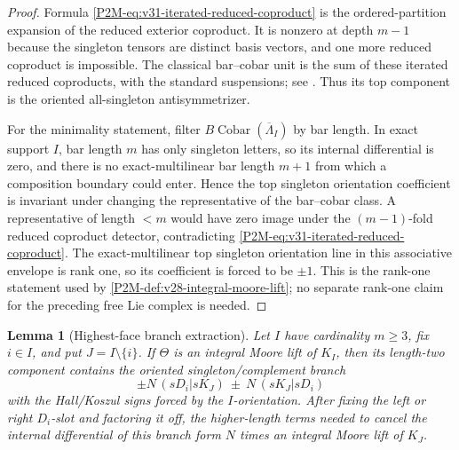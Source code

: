 \documentclass[11pt]{article}
\newtheorem{lemma}[theorem]{Lemma}
\theoremstyle{remark}
\newcommand{\Cobar}{\operatorname{Cobar}}
\begin{document}
\begin{proof}
Formula \eqref{P2M-eq:v31-iterated-reduced-coproduct} is the ordered-partition
expansion of the reduced exterior coproduct.  It is nonzero at depth
\(m-1\) because the singleton tensors are distinct basis vectors, and one
more reduced coproduct is impossible.  The classical bar--cobar unit is the
sum of these iterated reduced coproducts, with the standard suspensions; see
\cite{Adams1956,HMS1974,LodayVallette2012}.  Thus its top component is the
oriented all-singleton antisymmetrizer.

For the minimality statement, filter \(B\Cobar(\overline\Lambda_I)\) by bar
length.  In exact support \(I\), bar length \(m\) has only singleton
letters, so its internal differential is zero, and there is no
exact-multilinear bar length \(m+1\) from which a composition boundary could
enter.  Hence the top singleton orientation coefficient is invariant under
changing the representative of the bar--cobar class.  A representative of
length \(<m\) would have zero image under the \((m-1)\)-fold reduced
coproduct detector, contradicting
\eqref{P2M-eq:v31-iterated-reduced-coproduct}.  The exact-multilinear top singleton orientation line in this associative
envelope is rank one, so its coefficient is forced to be \(\pm1\).  This is
the rank-one statement used by \cref{P2M-def:v28-integral-moore-lift}; no separate
rank-one claim for the preceding free Lie complex is needed.
\end{proof}

\begin{lemma}[Highest-face branch extraction]
\label{P2M-lem:v28-highest-face-branch}
Let \(I\) have cardinality \(m\ge3\), fix \(i\in I\), and put
\(J=I\setminus\{i\}\).  If \(\Theta\) is an integral Moore lift of \(K_I\),
then its length-two component contains the oriented
singleton/complement branch
\begin{equation}
 \boxed{
 \pm N\,(sD_i|sK_J)
 \ \pm\
 N\,(sK_J|sD_i)}
\end{equation}
with the Hall/Koszul signs forced by the \(I\)-orientation.  After fixing the
left or right \(D_i\)-slot and factoring it off, the higher-length terms
needed to cancel the internal differential of this branch form \(N\) times an
integral Moore lift of \(K_J\).
\end{lemma}
\end{document}
